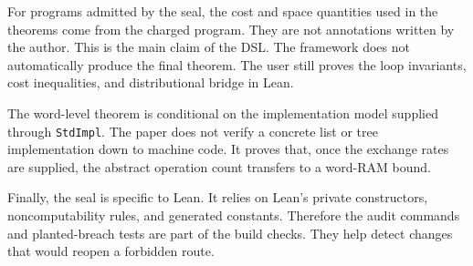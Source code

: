 \documentclass[acmsmall,nonacm]{acmart}
\begin{document}
For programs admitted by the seal, the cost and space quantities used in the theorems come from the charged program.
They are not annotations written by the author.
This is the main claim of the DSL.
The framework does not automatically produce the final theorem.
The user still proves the loop invariants, cost inequalities, and distributional bridge in Lean.

The word-level theorem is conditional on the implementation model supplied through \lstinline{StdImpl}.
The paper does not verify a concrete list or tree implementation down to machine code.
It proves that, once the exchange rates are supplied, the abstract operation count transfers to a word-RAM bound.

Finally, the seal is specific to Lean.
It relies on Lean's private constructors, noncomputability rules, and generated constants.
Therefore the audit commands and planted-breach tests are part of the build checks.
They help detect changes that would reopen a forbidden route.
\end{document}

